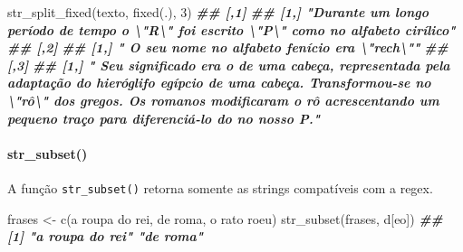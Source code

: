 \documentclass[
]{book}
\newenvironment{Shaded}{\begin{snugshade}}{\end{snugshade}}
\newcommand{\DecValTok}[1]{\textcolor[rgb]{0.00,0.00,0.81}{#1}}
\newcommand{\DocumentationTok}[1]{\textcolor[rgb]{0.56,0.35,0.01}{\textbf{\textit{#1}}}}
\newcommand{\FunctionTok}[1]{\textcolor[rgb]{0.00,0.00,0.00}{#1}}
\newcommand{\NormalTok}[1]{#1}
\newcommand{\OtherTok}[1]{\textcolor[rgb]{0.56,0.35,0.01}{#1}}
\newcommand{\StringTok}[1]{\textcolor[rgb]{0.31,0.60,0.02}{#1}}
\begin{document}
\begin{Shaded}
\begin{Highlighting}[]
\FunctionTok{str\_split\_fixed}\NormalTok{(texto, }\FunctionTok{fixed}\NormalTok{(}\StringTok{\textquotesingle{}.\textquotesingle{}}\NormalTok{), }\DecValTok{3}\NormalTok{)}
\DocumentationTok{\#\#      [,1]                                                                                   }
\DocumentationTok{\#\# [1,] "Durante um longo período de tempo o \textbackslash{}"R\textbackslash{}" foi escrito \textbackslash{}"P\textbackslash{}" como no alfabeto cirílico"}
\DocumentationTok{\#\#      [,2]                                          }
\DocumentationTok{\#\# [1,] " O seu nome no alfabeto fenício era \textbackslash{}"rech\textbackslash{}""}
\DocumentationTok{\#\#      [,3]                                                                                                                                                                                                                                      }
\DocumentationTok{\#\# [1,] " Seu significado era o de uma cabeça, representada pela adaptação do hieróglifo egípcio de uma cabeça. Transformou{-}se no \textbackslash{}"rô\textbackslash{}" dos gregos. Os romanos modificaram o rô acrescentando um pequeno traço para diferenciá{-}lo do no nosso P."}
\end{Highlighting}
\end{Shaded}

\hypertarget{str_subset}{%
\paragraph*{str\_subset()}\label{str_subset}}

A função \texttt{str\_subset()} retorna somente as strings compatíveis com a regex.

\begin{Shaded}
\begin{Highlighting}[]
\NormalTok{frases }\OtherTok{\textless{}{-}} \FunctionTok{c}\NormalTok{(}\StringTok{\textquotesingle{}a roupa do rei\textquotesingle{}}\NormalTok{, }\StringTok{\textquotesingle{}de roma\textquotesingle{}}\NormalTok{, }\StringTok{\textquotesingle{}o rato roeu\textquotesingle{}}\NormalTok{)}
\FunctionTok{str\_subset}\NormalTok{(frases, }\StringTok{\textquotesingle{}d[eo]\textquotesingle{}}\NormalTok{)}
\DocumentationTok{\#\# [1] "a roupa do rei" "de roma"}
\end{Highlighting}
\end{Shaded}
\end{document}
